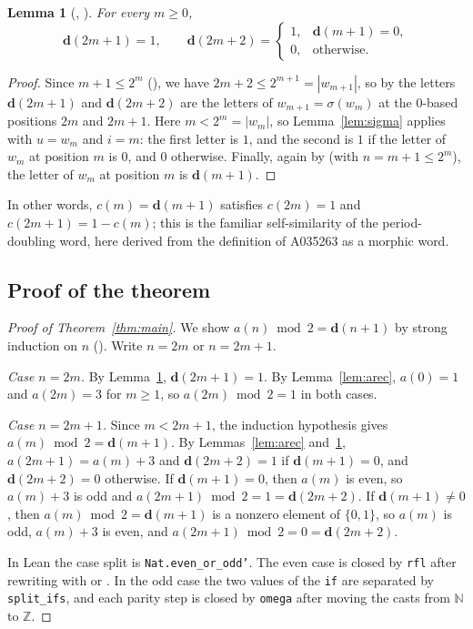 \documentclass[11pt]{amsart}
\theoremstyle{plain}
\newtheorem{lemma}[theorem]{Lemma}
\theoremstyle{definition}
\newcommand{\N}{\mathbb{N}}
\newcommand{\Z}{\mathbb{Z}}
\newcommand{\pd}{\mathbf{d}}
\begin{document}
\begin{lemma}[, ]\label{lem:drec}
For every $m\ge0$,
\[
  \pd(2m+1)=1,\qquad \pd(2m+2)=\begin{cases}1,&\pd(m+1)=0,\\0,&\text{otherwise.}\end{cases}
\]
\end{lemma}

\begin{proof}
Since $m+1\le 2^m$ (), we have $2m+2\le2^{m+1}=|w_{m+1}|$, so by  the letters $\pd(2m+1)$ and $\pd(2m+2)$ are the letters of $w_{m+1}=\sigma(w_m)$ at the $0$-based positions $2m$ and $2m+1$. Here $m<2^m=|w_m|$, so Lemma~\ref{lem:sigma} applies with $u=w_m$ and $i=m$: the first letter is $1$, and the second is $1$ if the letter of $w_m$ at position $m$ is $0$, and $0$ otherwise. Finally, again by  (with $n=m+1\le2^m$), the letter of $w_m$ at position $m$ is $\pd(m+1)$.
\end{proof}

In other words, $c(m)=\pd(m+1)$ satisfies $c(2m)=1$ and $c(2m+1)=1-c(m)$; this is the familiar self-similarity of the period-doubling word, here derived from the definition of A035263 as a morphic word.

\subsection{Proof of the theorem}

\begin{proof}[Proof of Theorem~\ref{thm:main}]
We show $a(n)\bmod2=\pd(n+1)$ by strong induction on $n$ (). Write $n=2m$ or $n=2m+1$.

\emph{Case $n=2m$.} By Lemma~\ref{lem:drec}, $\pd(2m+1)=1$. By Lemma~\ref{lem:arec}, $a(0)=1$ and $a(2m)=3$ for $m\ge1$, so $a(2m)\bmod2=1$ in both cases.

\emph{Case $n=2m+1$.} Since $m<2m+1$, the induction hypothesis gives $a(m)\bmod 2=\pd(m+1)$. By Lemmas~\ref{lem:arec} and~\ref{lem:drec}, $a(2m+1)=a(m)+3$ and $\pd(2m+2)=1$ if $\pd(m+1)=0$, and $\pd(2m+2)=0$ otherwise. If $\pd(m+1)=0$, then $a(m)$ is even, so $a(m)+3$ is odd and $a(2m+1)\bmod2=1=\pd(2m+2)$. If $\pd(m+1)\ne0$, then $a(m)\bmod2=\pd(m+1)$ is a nonzero element of $\{0,1\}$, so $a(m)$ is odd, $a(m)+3$ is even, and $a(2m+1)\bmod2=0=\pd(2m+2)$.

In Lean the case split is \texttt{Nat.even\_or\_odd'}. The even case is closed by \texttt{rfl} after rewriting with  or . In the odd case the two values of the \texttt{if} are separated by \texttt{split\_ifs}, and each parity step is closed by \texttt{omega} after moving the casts from $\N$ to $\Z$.
\end{proof}
\end{document}

